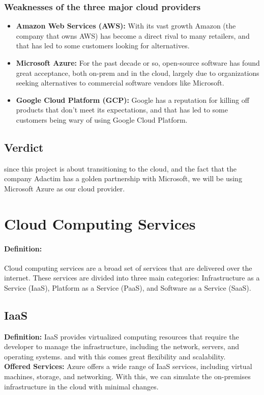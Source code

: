 \subsubsection*{Weaknesses of the three major cloud providers \cite{webArticle1}}
\begin{itemize}
    \item \textbf{Amazon Web Services (AWS):} With its vast growth Amazon (the company that owns AWS) has become a direct rival to many retailers, and that has led to some customers looking for alternatives.
    \item \textbf{Microsoft Azure:} For the past decade or so, open-source software has found great acceptance, both on-prem and in the cloud, largely due to organizations seeking alternatives to commercial software vendors like Microsoft.
    \item \textbf{Google Cloud Platform (GCP):} Google has a reputation for killing off products that don't meet its expectations, and that has led to some customers being wary of using Google Cloud Platform.
\end{itemize}
\subsection*{Verdict}
since this project is about transitioning to the cloud, and the fact that the company Adactim has a golden partnership with Microsoft, we will be using Microsoft Azure as our cloud provider.

\section{Cloud Computing Services}
\paragraph*{Definition:} Cloud computing services are a broad set of services that are delivered over the internet. These services are divided into three main categories: Infrastructure as a Service (IaaS), Platform as a Service (PaaS), and Software as a Service (SaaS).
\subsection*{IaaS}
\noindent
\textbf{Definition:} IaaS provides virtualized computing resources that require the developer to manage the infrastructure, including the network, servers, and operating systems. and with this comes great flexibility and scalability.
\noindent \\
\textbf{Offered Services:} Azure offers a wide range of IaaS services, including virtual machines, storage, and networking. With this, we can simulate the on-premises infrastructure in the cloud with minimal changes.
